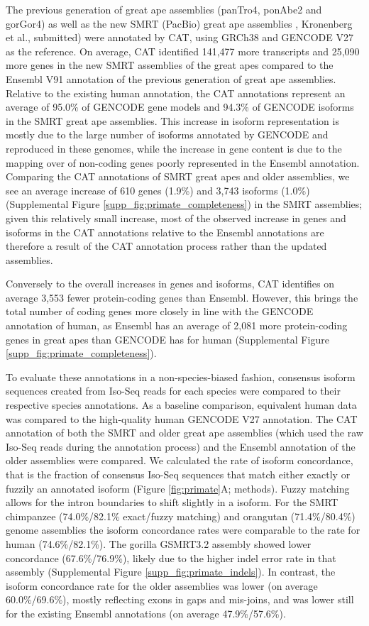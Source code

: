 \documentclass[fleqn,10pt]{wlscirep}
\renewcommand\citeright{)}
\begin{document}
The previous generation of great ape assemblies (panTro4, ponAbe2 and gorGor4) as well as the new SMRT (PacBio) great ape assemblies \renewcommand\citeright{}\cite{gordon2016long}, Kronenberg et al., submitted)\renewcommand\citeright{)} were annotated by CAT, using GRCh38 and GENCODE V27 as the reference. On average, CAT identified 141,477 more transcripts and 25,090 more genes in the new SMRT assemblies of the great apes compared to the Ensembl V91 annotation of the previous generation of great ape assemblies. Relative to the existing human annotation, the CAT annotations represent an average of 95.0\% of GENCODE gene models and 94.3\% of GENCODE isoforms in the SMRT great ape assemblies. This increase in isoform representation is mostly due to the large number of isoforms annotated by GENCODE and reproduced in these genomes, while the increase in gene content is due to the mapping over of non-coding genes poorly represented in the Ensembl annotation. Comparing the CAT annotations of SMRT great apes and older assemblies, we see an average increase of 610 genes (1.9\%) and 3,743 isoforms (1.0\%) (Supplemental Figure \ref{supp_fig:primate_completeness}) in the SMRT assemblies; given this relatively small increase, most of the observed increase in genes and isoforms in the CAT annotations relative to the Ensembl annotations are therefore a result of the CAT annotation process rather than the updated assemblies.

Conversely to the overall increases in genes and isoforms, CAT identifies on average 3,553 fewer protein-coding genes than Ensembl. However, this brings the total number of coding genes more closely in line with the GENCODE annotation of human, as Ensembl has an average of 2,081 more protein-coding genes in great apes than GENCODE has for human (Supplemental Figure \ref{supp_fig:primate_completeness}). 

To evaluate these annotations in a non-species-biased fashion, consensus isoform sequences created from Iso-Seq reads for each species were compared to their respective species annotations. As a baseline comparison, equivalent human data was compared to the high-quality human GENCODE V27 annotation. The CAT annotation of both the SMRT and older great ape assemblies (which used the raw Iso-Seq reads during the annotation process) and the Ensembl annotation of the older assemblies were compared. We calculated the rate of isoform concordance, that is the fraction of consensus Iso-Seq sequences that match either exactly or fuzzily an annotated isoform (Figure \ref{fig:primate}A; methods). Fuzzy matching allows for the intron boundaries to shift slightly in a isoform. For the SMRT chimpanzee (74.0\%/82.1\% exact/fuzzy matching) and orangutan (71.4\%/80.4\%) genome assemblies the isoform concordance rates were comparable to the rate for human (74.6\%/82.1\%). The gorilla GSMRT3.2 assembly showed lower concordance (67.6\%/76.9\%), likely due to the higher indel error rate in that assembly (Supplemental Figure \ref{supp_fig:primate_indels}). In contrast, the isoform concordance rate for the older assemblies was lower (on average 60.0\%/69.6\%), mostly reflecting exons in gaps and mis-joins, and was lower still for the existing Ensembl annotations (on average 47.9\%/57.6\%).
\end{document}

